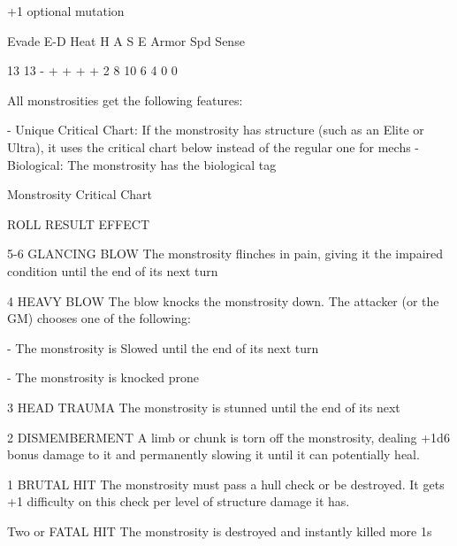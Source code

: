 +1 optional mutation
 

         Evade    E-D     Heat    H   A   S    E   Armor     Spd       Sense 

         13       13      -       +   +   +    +   2         8         10 
                                  6   4   0    0 

All monstrosities get the following features:
 
    -    Unique Critical Chart: If the monstrosity has structure (such as an Elite or Ultra), it uses  
         the critical chart below instead of the regular one for mechs  
    -    Biological: The monstrosity has the biological tag  

                                          Monstrosity Critical Chart  

 ROLL       RESULT                   EFFECT 

 5-6         GLANCING BLOW           The monstrosity flinches in pain, giving it the impaired condition until  
                                     the end of its next turn 

 4           HEAVY BLOW              The blow knocks the monstrosity down. The attacker (or the GM)  
                                     chooses one of the following:
 
                                         -   The monstrosity is Slowed until the end of its next turn
 
                                         -   The monstrosity is knocked prone 

 3           HEAD TRAUMA             The monstrosity is stunned until the end of its next 

 2           DISMEMBERMENT           A limb or chunk is torn off the monstrosity, dealing +1d6 bonus damage  
                                     to it and permanently slowing it until it can potentially heal. 

 1           BRUTAL HIT              The monstrosity must pass a hull check or be destroyed. It gets +1  
                                     difficulty on this check per level of structure damage it has. 

                                                                                                                 


Two or     FATAL HIT              The monstrosity is destroyed and instantly killed 
more  
1s 

                                                                                                          


